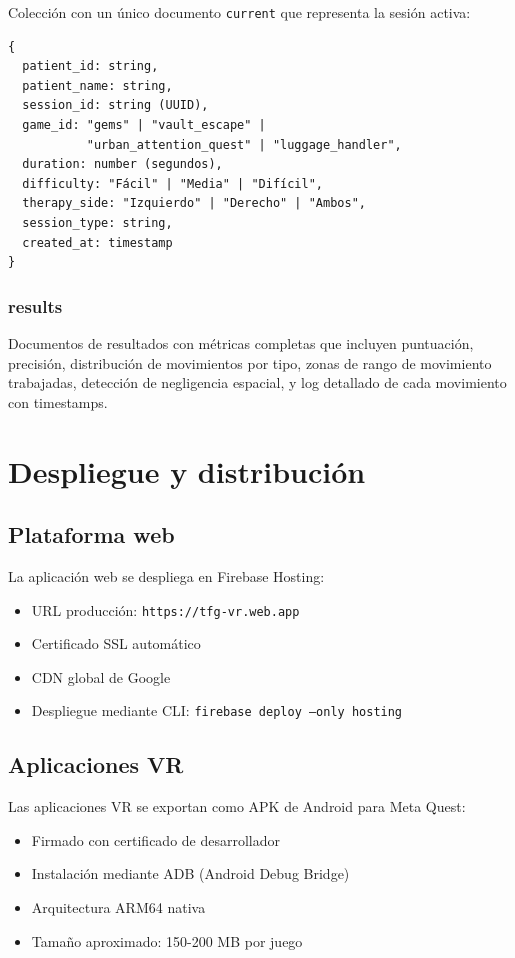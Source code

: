 Colección con un único documento \texttt{current} que representa la sesión activa:
\begin{verbatim}
{
  patient_id: string,
  patient_name: string,
  session_id: string (UUID),
  game_id: "gems" | "vault_escape" | 
           "urban_attention_quest" | "luggage_handler",
  duration: number (segundos),
  difficulty: "Fácil" | "Media" | "Difícil",
  therapy_side: "Izquierdo" | "Derecho" | "Ambos",
  session_type: string,
  created_at: timestamp
}
\end{verbatim}

\subsubsection{results}

Documentos de resultados con métricas completas que incluyen puntuación, precisión, distribución de movimientos por tipo, zonas de rango de movimiento trabajadas, detección de negligencia espacial, y log detallado de cada movimiento con timestamps.

\section{Despliegue y distribución}

\subsection{Plataforma web}

La aplicación web se despliega en Firebase Hosting:
\begin{itemize}
    \item URL producción: \texttt{https://tfg-vr.web.app}
    \item Certificado SSL automático
    \item CDN global de Google
    \item Despliegue mediante CLI: \texttt{firebase deploy --only hosting}
\end{itemize}

\subsection{Aplicaciones VR}

Las aplicaciones VR se exportan como APK de Android para Meta Quest:
\begin{itemize}
    \item Firmado con certificado de desarrollador
    \item Instalación mediante ADB (Android Debug Bridge)
    \item Arquitectura ARM64 nativa
    \item Tamaño aproximado: 150-200 MB por juego
\end{itemize}

